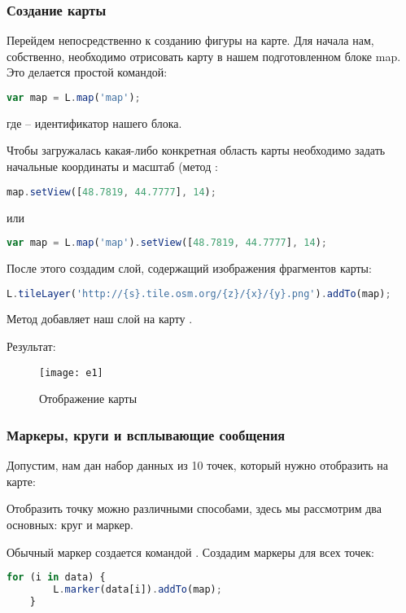 \subsubsection{Создание карты}
Перейдем непосредственно к созданию фигуры на карте. Для начала нам, 
собственно, необходимо отрисовать карту в нашем подготовленном блоке map. 
Это делается простой командой:
\begin{lstlisting}[language=js]
    var map = L.map('map');
\end{lstlisting}
где  -- идентификатор нашего блока.

Чтобы загружалась какая-либо конкретная область карты необходимо задать 
начальные координаты и масштаб (метод 
:
\begin{lstlisting}[language=js]
    map.setView([48.7819, 44.7777], 14);
\end{lstlisting}
или
\begin{lstlisting}[language=js]
    var map = L.map('map').setView([48.7819, 44.7777], 14);
\end{lstlisting}

После этого создадим слой, содержащий изображения фрагментов карты:
\begin{lstlisting}[language=js]
    L.tileLayer('http://{s}.tile.osm.org/{z}/{x}/{y}.png').addTo(map);
\end{lstlisting}
Метод  добавляет наш слой на карту .

Результат:
\begin{figure}[ht!]
    \center
    \texttt{[image: e1]}
    \caption{Отображение карты}
\end{figure}

\subsubsection{Маркеры, круги и всплывающие сообщения}
Допустим, нам дан набор данных из 10 точек, который нужно отобразить на карте:


Отобразить точку можно различными способами, здесь мы рассмотрим два 
основных: круг и маркер.

Обычный маркер создается командой . 
Создадим маркеры для всех точек:
\begin{lstlisting}[language=js]
    for (i in data) {
        L.marker(data[i]).addTo(map);
    }
\end{lstlisting}

